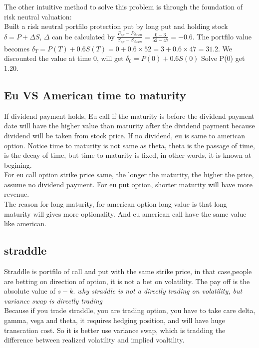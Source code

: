 \documentclass[a4paper,11pt]{article}
\begin{document}
The other intuitive method to solve this problem is through the foundation of risk neutral valuation:\\
Built a risk neutral portfilo protection put by long put and holding stock $\delta=P+\Delta S$, $\Delta$ can be calculated by $\frac{P_{up}-P_{down}}{S_{up}-S_{down}}=\frac{0-3}{52-47}=-0.6$. The portfilo value becomes
$\delta_T=P(T)+0.6S(T)=0+0.6\times 52=3+0.6\times 47=31.2$. We discounted the value at time 0, will get $\delta_0=P(0)+0.6S(0)$ Solve P(0) get 1.20.\\
\subsection{Eu VS American time to maturity}
If dividend payment holds, Eu call if the maturity is before the dividend payment date will have the higher value than maturity after the dividend payment because dividend will be taken from stock price.
If no dividend, eu is same to american option. Notice time to maturity is not same as theta, theta is the passage of time, is the decay of time, but time to maturity is fixed, in other words, it is known at begining.\\
For eu call option strike price same, the longer the maturity, the higher the price, assume no dividend payment. For eu put option, shorter maturity will have more revenue.\\
The reason for long maturity, for american option long value is that long maturity will gives more optionality. And eu american call have the same value like american.
\subsection{straddle}
Straddle is portfilo of call and put with the same strike price, in that case,people are betting on direction of option, it is not a bet on volatility. The pay off is the absolute value of $s-k$.
{\em why straddle is not a directly trading on volatility, but variance swap is directly trading}\\
Because if you trade straddle, you are trading option, you have to take care delta, gamma, vega and theta, it requires hedging position, and will have huge transcation cost. So it is better use variance swap, which is tradding the difference between realized volatility and implied voaltility.\\
\end{document}
